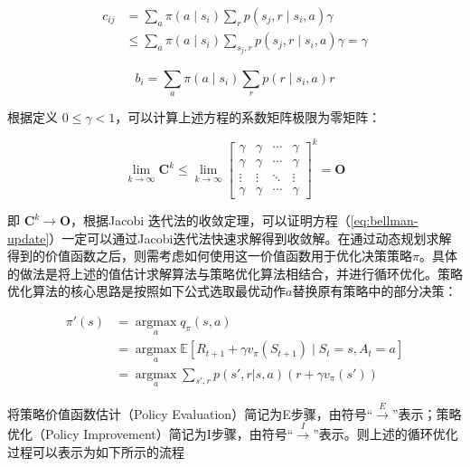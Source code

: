\begin{equation}
\begin{aligned}
        c_{ij} &=\sum_a\pi(a\mid s_i)\sum_{r}p(s_j,r \mid s_i,a)\gamma\\
        &\leq \sum_a\pi(a\mid s_i)\sum_{s_j,r}p(s_j,r \mid s_i,a)\gamma=\gamma
    \end{aligned}
\end{equation}

\begin{equation}
b_{i} =\sum_a\pi(a\mid s_i)\sum_{r}p(r\mid s_i,a)r
\end{equation}

根据定义 $0\leq\gamma<1$，可以计算上述方程的系数矩阵极限为零矩阵：

\begin{equation}
\lim_{k\rightarrow \infty} \boldsymbol{C}^k \leq \lim_{k\rightarrow \infty}\begin{bmatrix}
    \gamma & \gamma & \cdots & \gamma\\
    \gamma & \gamma & \cdots & \gamma\\
    \vdots & \vdots & \ddots & \vdots\\
    \gamma & \gamma & \cdots & \gamma
    \end{bmatrix}^k = \boldsymbol{O}
\end{equation}

即 $\boldsymbol{C}^k\rightarrow\boldsymbol{O}$，根据Jacobi 迭代法的收敛定理，可以证明方程（\ref{eq:bellman-update}）一定可以通过Jacobi迭代法快速求解得到收敛解。在通过动态规划求解得到的价值函数之后，则需考虑如何使用这一价值函数用于优化决策策略$\pi$。具体的做法是将上述的值估计求解算法与策略优化算法相结合，并进行循环优化。策略优化算法的核心思路是按照如下公式选取最优动作$a$替换原有策略中的部分决策：

\begin{equation}
    \begin{aligned}\pi'(s) &= \mathop{\arg\max}\limits_a q_\pi(s, a)\\&=\mathop{\arg\max}\limits_a \mathbb{E}[R_{t+1}+\gamma v_\pi(S_{t+1})\mid S_t=s,A_t=a] \\&= \mathop{\arg\max}\limits_a \sum_{s',r} p(s', r | s, a) (r + \gamma v_\pi(s'))\end{aligned}
\end{equation}

将策略价值函数估计（Policy Evaluation）简记为E步骤，由符号“$\xrightarrow{E}$”表示；策略优化（Policy Improvement）简记为I步骤，由符号“$\xrightarrow{I}$”表示。则上述的循环优化过程可以表示为如下所示的流程

